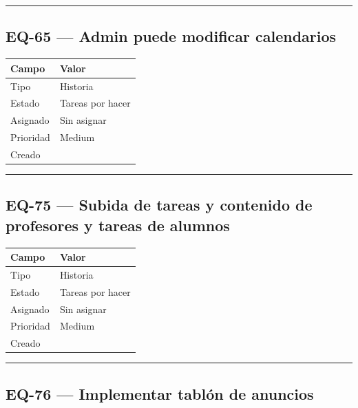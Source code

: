 \documentclass[
  spanish,
  11pt,
]{report}
\newcounter{none} %
\begin{document}
\begin{center}\rule{0.5\linewidth}{0.5pt}\end{center}

\subsection{EQ-65 --- Admin puede modificar
calendarios}\label{eq-65-admin-puede-modificar-calendarios}

{\def\LTcaptype{none} %
\begin{longtable}[]{@{}ll@{}}
\toprule\noalign{}
Campo & Valor \\
\midrule\noalign{}
\endhead
\bottomrule\noalign{}
\endlastfoot
Tipo & Historia \\
Estado & Tareas por hacer \\
Asignado & Sin asignar \\
Prioridad & Medium \\
Creado & \\
\end{longtable}
}

\begin{center}\rule{0.5\linewidth}{0.5pt}\end{center}

\subsection{EQ-75 --- Subida de tareas y contenido de profesores y
tareas de
alumnos}\label{eq-75-subida-de-tareas-y-contenido-de-profesores-y-tareas-de-alumnos}

{\def\LTcaptype{none} %
\begin{longtable}[]{@{}ll@{}}
\toprule\noalign{}
Campo & Valor \\
\midrule\noalign{}
\endhead
\bottomrule\noalign{}
\endlastfoot
Tipo & Historia \\
Estado & Tareas por hacer \\
Asignado & Sin asignar \\
Prioridad & Medium \\
Creado & \\
\end{longtable}
}

\begin{center}\rule{0.5\linewidth}{0.5pt}\end{center}

\subsection{EQ-76 --- Implementar tablón de
anuncios}\label{eq-76-implementar-tabluxf3n-de-anuncios}
\end{document}
